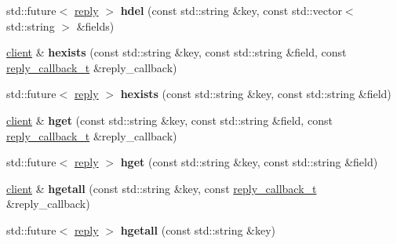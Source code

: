 \begin{DoxyCompactItemize}
\mbox{\label{classcpp__redis_1_1client_a56d4df4d31ffc56e097a8a78cb85d861}} 
std\+::future$<$ \hyperlink{classcpp__redis_1_1reply}{reply} $>$ {\bfseries hdel} (const std\+::string \&key, const std\+::vector$<$ std\+::string $>$ \&fields)
\item 
\mbox{\label{classcpp__redis_1_1client_a36aa37c50e8b5e44e17c4f1f0d2c656e}} 
\hyperlink{classcpp__redis_1_1client}{client} \& {\bfseries hexists} (const std\+::string \&key, const std\+::string \&field, const \hyperlink{classcpp__redis_1_1client_a061a1140d36d2eaeda82b09a0bb3f9f2}{reply\+\_\+callback\+\_\+t} \&reply\+\_\+callback)
\item 
\mbox{\label{classcpp__redis_1_1client_a1fede52ba18414d75f37e776cc62b7f8}} 
std\+::future$<$ \hyperlink{classcpp__redis_1_1reply}{reply} $>$ {\bfseries hexists} (const std\+::string \&key, const std\+::string \&field)
\item 
\mbox{\label{classcpp__redis_1_1client_ac1db14da1ab3d1353ce35a1c923979e3}} 
\hyperlink{classcpp__redis_1_1client}{client} \& {\bfseries hget} (const std\+::string \&key, const std\+::string \&field, const \hyperlink{classcpp__redis_1_1client_a061a1140d36d2eaeda82b09a0bb3f9f2}{reply\+\_\+callback\+\_\+t} \&reply\+\_\+callback)
\item 
\mbox{\label{classcpp__redis_1_1client_aa84b4c8e9391f5ed37d4c9ef977e2c85}} 
std\+::future$<$ \hyperlink{classcpp__redis_1_1reply}{reply} $>$ {\bfseries hget} (const std\+::string \&key, const std\+::string \&field)
\item 
\mbox{\label{classcpp__redis_1_1client_a8bd82cb86dad87a944c039a57bf67968}} 
\hyperlink{classcpp__redis_1_1client}{client} \& {\bfseries hgetall} (const std\+::string \&key, const \hyperlink{classcpp__redis_1_1client_a061a1140d36d2eaeda82b09a0bb3f9f2}{reply\+\_\+callback\+\_\+t} \&reply\+\_\+callback)
\item 
\mbox{\label{classcpp__redis_1_1client_a44321960e02c6ee6b6b36ffc960e4257}} 
std\+::future$<$ \hyperlink{classcpp__redis_1_1reply}{reply} $>$ {\bfseries hgetall} (const std\+::string \&key)

\end{DoxyCompactItemize}
